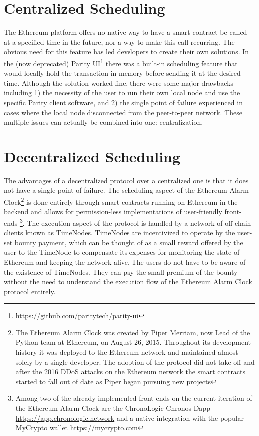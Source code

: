 \documentclass{report}
\begin{document}
  \section{Centralized Scheduling}
  The Ethereum platform offers no native way to have a smart contract be called at a specified time in the future, nor a way to make this call recurring. The obvious need for this feature has led developers to create their own solutions. In the (now deprecated) Parity UI\footnote{\url{https://github.com/paritytech/parity-ui}} there was a built-in scheduling feature that would locally hold the transaction in-memory before sending it at the desired time. Although the solution worked fine, there were some major drawbacks including 1) the necessity of the user to run their own local node and use the specific Parity client software, and 2) the single point of failure experienced in cases where the local node disconnected from the peer-to-peer network. These multiple issues can actually be combined into one: centralization.
  \section{Decentralized Scheduling}
  The advantages of a decentralized protocol over a centralized one is that it does not have a single point of failure. The scheduling aspect of the Ethereum Alarm Clock\footnote{The Ethereum Alarm Clock was created by Piper Merriam, now Lead of the Python team at Ethereum, on August 26, 2015. Throughout its development history it was deployed to the Ethereum network and maintained almost solely by a single developer. The adoption of the protocol did not take off and after the 2016 DDoS attacks on the Ethereum network the smart contracts started to fall out of date as Piper began pursuing new projects} is done entirely through smart contracts running on Ethereum in the backend and allows for permission-less implementations of user-friendly front-ends \footnote{Among two of the already implemented front-ends on the current iteration of the Ethereum Alarm Clock are the ChronoLogic Chronos Dapp \url{https://app.chronologic.network} and a native integration with the popular MyCrypto wallet \url{https://mycrypto.com}}. The execution aspect of the protocol is handled by a network of off-chain clients known as TimeNodes. TimeNodes are incentivized to operate by the user-set bounty payment, which can be thought of as a small reward offered by the user to the TimeNode to compensate its expenses for monitoring the state of Ethereum and keeping the network alive. The users do not have to be aware of the existence of TimeNodes. They can pay the small premium of the bounty without the need to understand the execution flow of the Ethereum Alarm Clock protocol entirely.
\end{document}

